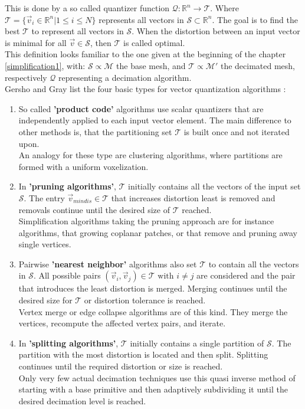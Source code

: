 This is done by a so called quantizer function $\mathcal{Q}: \mathbb{R}^{n} \rightarrow \mathcal{T}$.
Where $\mathcal{T} = \{\vec{v}_{i} \in \mathbb{R}^{n} | 1 \leq i \leq N\}$ represents all vectors in $\mathcal{S} \subset \mathbb{R}^{n}$.
The goal is to find the best $\mathcal{T}$ to represent all vectors in $\mathcal{S}$.
When the distortion between an input vector is minimal for all $\vec{v} \in \mathcal{S}$, then $\mathcal{T}$ is called optimal.\\
This definition looks familiar to the one given at the beginning of the chapter \ref{simplification1}, with: $\mathcal{S} \propto \mathcal{M}$ the base mesh, and $\mathcal{T} \propto \mathcal{M'}$ the decimated mesh, respectively $\mathcal{Q}$ representing a decimation algorithm.\\
Gersho and Gray list the four basic types for vector quantization algorithms \citep[][cf. pp.358 ff.]{Gersho1991}:
\begin{enumerate}
	\item So called \textbf{'product code'} algorithms use scalar quantizers that are independently applied to each input vector element.
	The main difference to other methods is, that the partitioning set $\mathcal{T}$ is built once and not iterated upon.\\
	An analogy for these type are clustering algorithms, where partitions are formed with a uniform voxelization.	
	\item  In \textbf{'pruning algorithms'}, $\mathcal{T}$ initially contains all the vectors of the input set $\mathcal{S}$. The entry $\vec{v}_{mindis} \in \mathcal{T}$ that increases distortion least is removed and removals continue until the desired size of $\mathcal{T}$ reached.\\
	Simplification algorithms taking the pruning approach are for instance algorithms, that growing coplanar patches, or that remove and pruning away single vertices.
	\item Pairwise \textbf{'nearest neighbor'} algorithms also set $\mathcal{T}$ to contain all the vectors in $\mathcal{S}$. All possible pairs $(\vec{v}_{i},\vec{v}_{j}) \in \mathcal{T} \text{ with } i\neq j$ are considered and the pair that introduces the least distortion is merged. Merging continues until the desired size for $\mathcal{T}$ or distortion tolerance is reached.\\
	Vertex merge or edge collapse algorithms are of this kind. They merge the vertices, recompute the affected vertex pairs, and iterate.
	\item In \textbf{'splitting algorithms'}, $\mathcal{T}$ initially contains a single partition of $\mathcal{S}$. The partition with the most distortion is located and then split. Splitting continues until the required distortion or size is reached.\\
	Only very few actual decimation techniques use this quasi inverse method of starting with a base primitive and then adaptively subdividing it until the desired decimation level is reached.
\end{enumerate}
